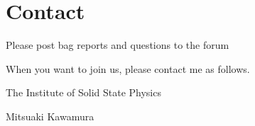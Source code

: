 \documentclass[letterpaper,10pt,pdftex,openany,english]{sphinxmanual}
\begin{document}
\chapter{Contact}
\label{\detokenize{contact:contact}}\label{\detokenize{contact::doc}}
\sphinxAtStartPar
Please post bag reports and questions to the forum

\sphinxAtStartPar
{}

\sphinxAtStartPar
When you want to join us, please contact me as follows.

\sphinxAtStartPar
The Institute of Solid State Physics

\sphinxAtStartPar
Mitsuaki Kawamura

\sphinxAtStartPar
{}



\renewcommand{\indexname}{Index}
\printindex
\end{document}

